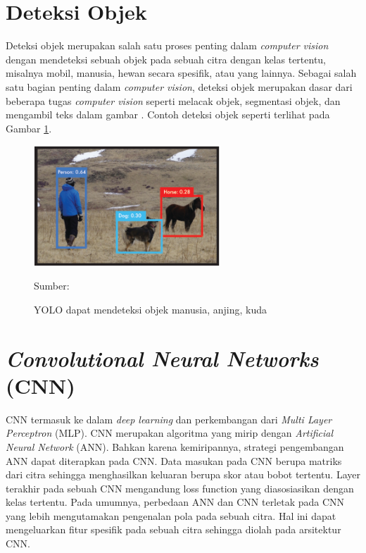 \section{Deteksi Objek}
Deteksi objek merupakan salah satu proses penting dalam \textit{computer vision} dengan mendeteksi sebuah objek pada sebuah citra dengan kelas tertentu, misalnya mobil, manusia, hewan secara spesifik, atau yang lainnya. Sebagai salah satu bagian penting dalam \textit{computer vision}, deteksi objek merupakan dasar dari beberapa tugas \textit{computer vision} seperti melacak objek, segmentasi objek, dan mengambil teks dalam gambar \citep{Zou2019}. Contoh deteksi objek seperti terlihat pada Gambar \ref{fig:obj-det}.

\begin{figure}[H]
    \begin{center}
        \includegraphics[width=7cm]{../img/Object Detection - Latex.png}
        \caption{YOLO dapat mendeteksi objek manusia, anjing, kuda}
        \label{fig:obj-det}
        Sumber: \citep{Redmon2016a}
    \end{center}
\end{figure}

\section{\textit{Convolutional Neural Networks} (CNN)}
CNN termasuk ke dalam \textit{deep learning} dan perkembangan dari \textit{Multi Layer Perceptron} (MLP). CNN merupakan algoritma yang mirip dengan \textit{Artificial Neural Network} (ANN). Bahkan karena kemiripannya, strategi pengembangan ANN dapat diterapkan pada CNN. Data masukan pada CNN berupa matriks dari citra sehingga menghasilkan keluaran berupa skor atau bobot tertentu. Layer terakhir pada sebuah CNN mengandung loss function yang diasosiasikan dengan kelas tertentu. Pada umumnya, perbedaan ANN dan CNN terletak pada CNN yang lebih mengutamakan pengenalan pola pada sebuah citra. Hal ini dapat mengeluarkan fitur spesifik pada sebuah citra sehingga diolah pada arsitektur CNN.

